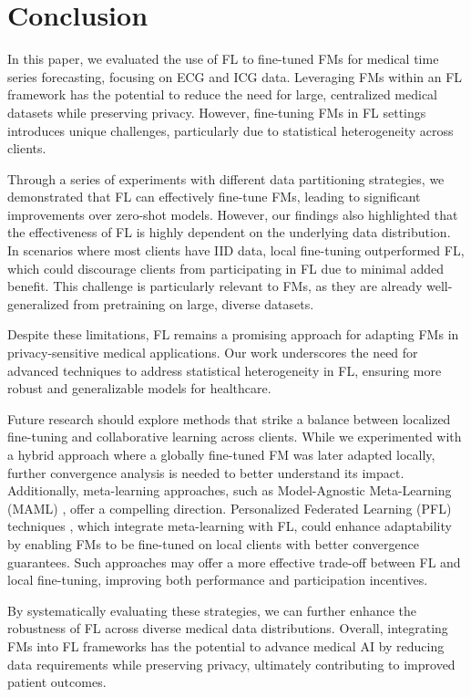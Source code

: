 \section{Conclusion}
In this paper, we evaluated the use of FL to fine-tuned FMs for medical time series forecasting, focusing on ECG and ICG data. Leveraging FMs within an FL framework has the potential to reduce the need for large, centralized medical datasets while preserving privacy. 
However, fine-tuning FMs in FL settings introduces unique challenges, particularly due to statistical heterogeneity across clients.

Through a series of experiments with different data partitioning strategies, we demonstrated that FL can effectively fine-tune FMs, leading to significant improvements over zero-shot models.
However, our findings also highlighted that the effectiveness of FL is highly dependent on the underlying data distribution. 
In scenarios where most clients have IID data, local fine-tuning outperformed FL, which could discourage clients from participating in FL due to minimal added benefit. This challenge is particularly relevant to FMs, as they are already well-generalized from pretraining on large, diverse datasets.

Despite these limitations, FL remains a promising approach for adapting FMs in privacy-sensitive medical applications. 
Our work underscores the need for advanced techniques to address statistical heterogeneity in FL, ensuring more robust and generalizable models for healthcare.

Future research should explore methods that strike a balance between localized fine-tuning and collaborative learning across clients. 
While we experimented with a hybrid approach where a globally fine-tuned FM was later adapted locally, further convergence analysis is needed to better understand its impact. 
Additionally, meta-learning approaches, such as Model-Agnostic Meta-Learning (MAML) \cite{10.5555/3305381.3305498}, offer a compelling direction. 
Personalized Federated Learning (PFL) techniques \cite{NEURIPS2020_24389bfe}, which integrate meta-learning with FL, could enhance adaptability by enabling FMs to be fine-tuned on local clients with better convergence guarantees. Such approaches may offer a more effective trade-off between FL and local fine-tuning, improving both performance and participation incentives.

By systematically evaluating these strategies, we can further enhance the robustness of FL across diverse medical data distributions. 
Overall, integrating FMs into FL frameworks has the potential to advance medical AI by reducing data requirements while preserving privacy, ultimately contributing to improved patient outcomes.